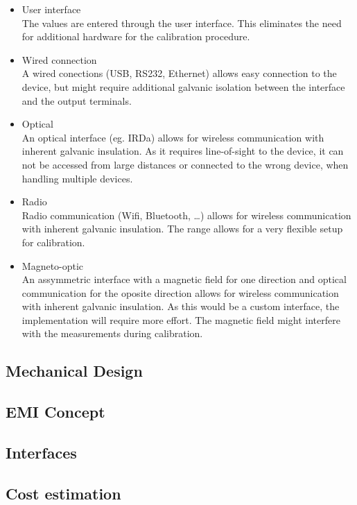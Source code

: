 \begin{itemize}
    \item User interface
        \\
        The values are entered through the user interface. This eliminates the need for additional hardware for the calibration procedure. 
    \item Wired connection
        \\
        A wired conections (\ac{USB}, RS232, Ethernet) allows easy connection to the device, but might require additional galvanic isolation between the interface and the output terminals. 
    \item Optical
        \\
        An optical interface (eg. IRDa) allows for wireless communication with inherent galvanic insulation. As it requires line-of-sight to the device, it can not be accessed from large distances or connected to the wrong device, when handling multiple devices. 
    \item Radio
        \\
        Radio communication (Wifi, Bluetooth, \ldots) allows for wireless communication with inherent galvanic insulation. The range allows for a very flexible setup for calibration. 
    \item Magneto-optic
        \\
        An assymmetric interface with a magnetic field for one direction and optical communication for the oposite direction allows for wireless communication with inherent galvanic insulation. As this would be a custom interface, the implementation will require more effort. The magnetic field might interfere with the measurements during calibration. 
\end{itemize}

\subsection{Mechanical Design}

\FloatBarrier
\subsection{EMI Concept}

\FloatBarrier
\subsection{Interfaces}

\FloatBarrier
\subsection{Cost estimation}

